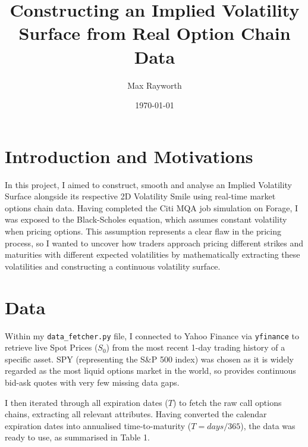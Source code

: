 \documentclass[11pt]{article}
\title{Constructing an Implied Volatility Surface from Real Option Chain Data}
\author{Max Rayworth}
\date{\today}
\begin{document}
\maketitle

\section{Introduction and Motivations}

In this project, I aimed to construct, smooth and analyse an Implied Volatility Surface alongside its respective 2D Volatility Smile using real-time market options chain data. Having completed the Citi MQA job simulation on Forage, I was exposed to the Black-Scholes equation, which assumes constant volatility when pricing options. This assumption represents a clear flaw in the pricing process, so I wanted to uncover how traders approach pricing different strikes and maturities with different expected volatilities by mathematically extracting these volatilities and constructing a continuous volatility surface.


\section{Data}

Within my \texttt{data\_fetcher.py} file, I connected to Yahoo Finance via \texttt{yfinance} to retrieve live Spot Prices ($S_0$) from the most recent 1-day trading history of a specific asset. SPY (representing the S\&P 500 index) was chosen as it is   widely regarded as the most liquid options market in the world, so provides continuous bid-ask quotes with very few missing data gaps. 

I then iterated through all expiration dates ($T$) to fetch the raw call options chains, extracting all relevant attributes. Having converted the calendar expiration dates into annualised time-to-maturity ($T = \mathit{days}/365$), the data was ready to use, as summarised in Table 1.
\end{document}
